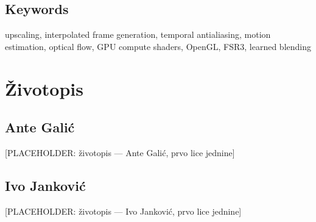 \documentclass{mathos}
\begin{document}
\section*{Keywords}

upscaling, interpolated frame generation, temporal antialiasing, motion
estimation, optical flow, GPU compute shaders, OpenGL, FSR3, learned blending


\chapter*{Životopis}


\section*{Ante Galić}
[PLACEHOLDER: životopis — Ante Galić, prvo lice jednine]

\section*{Ivo Janković}
[PLACEHOLDER: životopis — Ivo Janković, prvo lice jednine]
\end{document}
